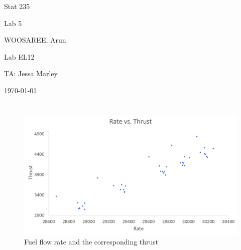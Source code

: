 \documentclass[letterpaper]{article}
\begin{document}
\begin{titlepage}
 \begin{center}
  \vspace*{1cm}
  \Huge
  Stat 235
  \vspace{1cm}
  
  Lab 5
  \vspace{1cm}
  
  WOOSAREE, Arun
  \vspace{1cm}
  
  \Huge
  Lab EL12
  \vspace{1cm}
  
  TA: Jessa Marley
  \vspace{1cm}
  
  \today
  \vfill
 \end{center}
\end{titlepage}

\section{}
\label{q1}

\subsection{}
\begin{figure}[H]
 \centering
 \includegraphics[width=\textwidth]{ratethrust.png}
 \caption{Fuel flow rate and the corresponding thrust}
 \label{ratethrust}
\end{figure}
\end{document}
